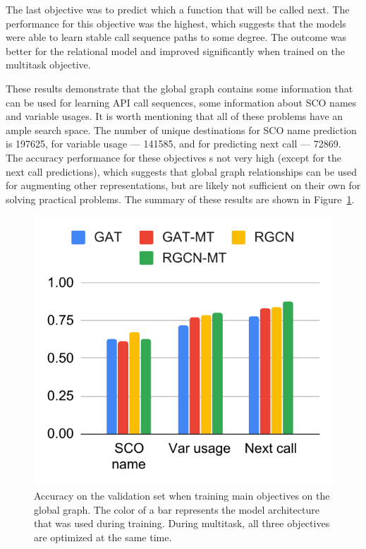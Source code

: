 \documentclass[a4paper,twoside]{article}
\begin{document}
The last objective was to predict which a function that will be called next. The performance for this objective was the highest, which suggests that the models were able to learn stable call sequence paths to some degree. The outcome was better for the relational model and improved significantly when trained on the multitask objective. 

These results demonstrate that the global graph contains some information that can be used for learning API call sequences, some information about SCO names and variable usages. It is worth mentioning that all of these problems have an ample search space. The number of unique destinations for SCO name prediction is 197625, for variable usage --- 141585, and for predicting next call --- 72869. The accuracy performance for these objectives s not very high (except for the next call predictions), which suggests that global graph relationships can be used for augmenting other representations, but are likely not sufficient on their own for solving practical problems. The summary of these results are shown in Figure~\ref{fig:main_obj}.

\begin{figure}[]
    \centering
    \includegraphics[width=\columnwidth]{main_objective.pdf}
    \caption{Accuracy on the validation set when training main objectives on the global graph. The color of a bar represents the model architecture that was used during training. During multitask, all three objectives are optimized at the same time.}\label{fig:main_obj}
\end{figure}
\end{document}

